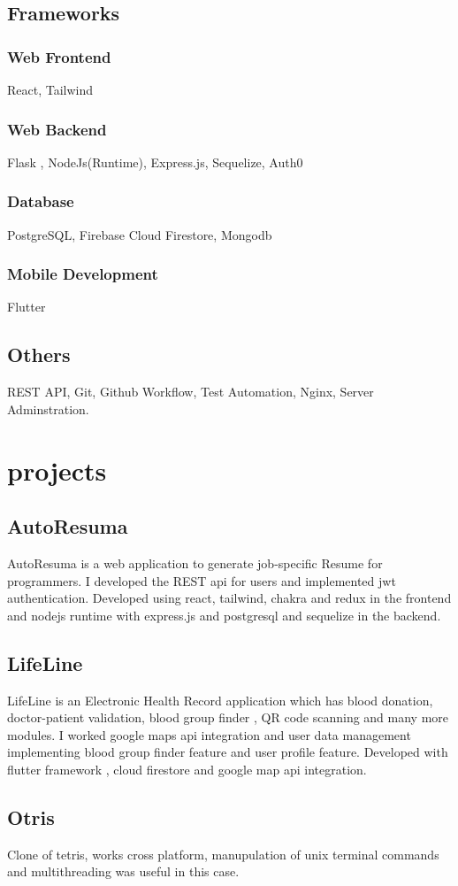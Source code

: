 \documentclass[a4paper,8pt]{extarticle}
\begin{document}
\subsection{Frameworks}
\subsubsection{Web Frontend}
React, Tailwind
\subsubsection{Web Backend}
Flask , NodeJs(Runtime), Express.js, Sequelize, Auth0
\subsubsection{Database}
PostgreSQL, Firebase Cloud Firestore, Mongodb
\subsubsection{Mobile Development}
Flutter
\subsection{Others}
REST API, Git, Github Workflow, Test Automation, Nginx, Server Adminstration.
\section{projects}

\subsection{AutoResuma}
AutoResuma is a web application to generate job-specific Resume for programmers. I developed the REST api for users and implemented jwt authentication. Developed using react, tailwind, chakra and redux in the frontend and nodejs runtime with express.js and postgresql and sequelize in the backend.
\subsection{LifeLine}
LifeLine is an Electronic Health Record application which has blood donation, doctor-patient validation, blood group finder , QR code scanning and many more modules. I worked google maps api integration and user data management implementing blood group finder feature and user profile feature. Developed with flutter framework , cloud firestore and google map api integration.
\subsection{Otris}
Clone of tetris, works cross platform, manupulation of unix terminal commands and multithreading was useful in this case.
\end{document}
